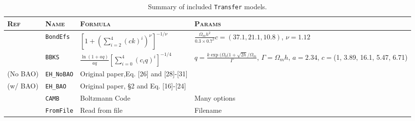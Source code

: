 \documentclass[5p]{elsarticle}
\newcommand{\bd}[1]{\textcolor{purple}{\textbf{[BD: #1]}}}
\begin{document}




\begin{table}
\centering
 {\tabulinesep=1.3mm
\begin{tabu}{X[1.5l]X[1l]X[3l]X[3l]} 
\toprule[0.05cm]
\textsc{Ref} & \textsc{Name} & \textsc{Formula} & \textsc{Params} \\
\midrule[0.05cm]
\citet{Bond1984} & \texttt{BondEfs} & $\left[1 + \left(\sum_{i=2}^4 (ck)^i \right)^\nu\right]^{-1/\nu}$ & $\displaystyle \frac{\Omega_m h^2}{0.3\times 0.7^2} c = (37.1,21.1,10.8)$, $\nu=1.12$ \\
\citet{Bardeen1986} & \texttt{BBKS} & $\displaystyle \frac{\ln(1+aq)}{aq} \left[\sum_{i=0}^4 (c_i q)^i\right]^{-1/4}$ & $\displaystyle q=\frac{k\exp(\Omega_b(1 + \sqrt{2h}/\Omega_m}{\Gamma}$, $\Gamma = \Omega_mh$,  $a=2.34$, $c=$(1, 3.89, 16.1, 5.47, 6.71) \\
\citet{Eisenstein1999} (No BAO) & \texttt{EH\_NoBAO} & Original paper,Eq. [26] and [28]-[31] & \\
\citet{Eisenstein1999} (w/ BAO) & \texttt{EH\_BAO} & Original paper, \S 2 and Eq. [16]-[24] & \\
\citet{Lewis2000} & \texttt{CAMB} & Boltzmann Code & Many options \\
 & \texttt{FromFile} & Read from file & Filename \\
\bottomrule[0.05cm]
\end{tabu}}
\caption{Summary of included \texttt{Transfer} models.}
\label{tab:models_transfer}
\end{table}
\end{document}

